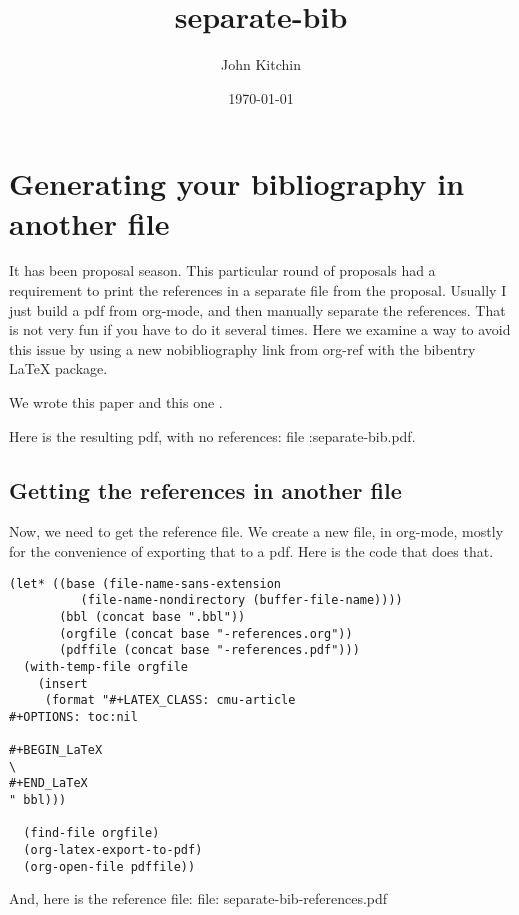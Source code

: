 \documentclass{article}
\author{John Kitchin}
\date{\today}
\title{separate-bib}
\begin{document}
\tableofcontents

\section{Generating your bibliography in another file}
\label{sec-1}

It has been proposal season. This particular round of proposals had a requirement to print the references in a separate file from the proposal. Usually I just build a pdf from org-mode, and then manually separate the references. That is not very fun if you have to do it several times. Here we examine a way to avoid this issue by using a new nobibliography link from org-ref with the bibentry \LaTeX{} package.

We wrote this paper \cite{mehta-2014-ident-poten} and this one \cite{xu-2014-relat}.



Here is the resulting pdf, with no references: file :separate-bib.pdf.


\subsection{Getting the references in another file}
\label{sec-1-1}
Now, we need to get the reference file. We create a new file, in org-mode, mostly for the convenience of exporting that to a pdf. Here is the code that does that.

\begin{verbatim}
(let* ((base (file-name-sans-extension
	      (file-name-nondirectory (buffer-file-name))))
       (bbl (concat base ".bbl"))
       (orgfile (concat base "-references.org"))
       (pdffile (concat base "-references.pdf")))
  (with-temp-file orgfile
    (insert 
     (format "#+LATEX_CLASS: cmu-article
#+OPTIONS: toc:nil

#+BEGIN_LaTeX
\
#+END_LaTeX
" bbl)))

  (find-file orgfile)
  (org-latex-export-to-pdf)
  (org-open-file pdffile))
\end{verbatim}

And, here is the reference file: file: separate-bib-references.pdf
\end{document}
